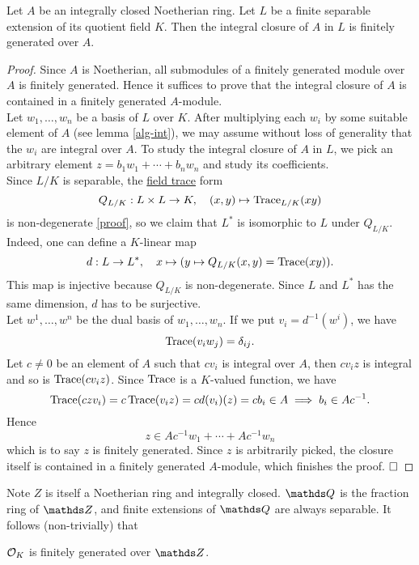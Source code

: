 			\begin{theorem}\label{closure-f-g}
				Let $A$ be an integrally closed Noetherian ring. Let $L$ be a finite separable extension of its quotient field $K$. Then the integral closure of $A$ in $L$ is finitely generated over $A$.
			\end{theorem}
			\begin{proof}
				Since $A$ is Noetherian, all submodules of a finitely generated module over $A$ is finitely generated. Hence it suffices to prove that the integral closure of $A$ is contained in a finitely generated $A$-module.\\
				Let $w_1,\dots,w_n$ be a basis of $L$ over $K$. After multiplying each $w_i$ by some suitable element of $A$ (see lemma \ref{alg-int}), we may assume without loss of generality that the $w_i$ are integral over $A$. To study the integral closure of $A$ in $L$, we pick an arbitrary element $z = b_1w_1+\cdots+b_nw_n$ and study its coefficients. \\
				Since $L/K$ is separable, the \href{https://stacks.math.columbia.edu/tag/0BIF}{field trace} form
				\[
					Q_{L/K}:L \times L \to K, \quad (x,y) \mapsto \tr_{L/K}(xy)
				\]
				is non-degenerate  \href{https://stacks.math.columbia.edu/tag/0BIL}{[proof]}, so we claim that $L^\ast$ is isomorphic to $L$ under $Q_{L/K}$. Indeed, one can define a $K$-linear map
				\[
					d:L \to L^\ast, \quad x \mapsto (y \mapsto Q_{L/K}(x,y)=\tr(xy)).
				\]
				This map is injective because $Q_{L/K}$ is non-degenerate. Since $L$ and $L^\ast$ has the same dimension, $d$ has to be surjective.\\
				Let $w^1,\dots,w^n$ be the dual basis of $w_1,\dots,w_n$. If we put $v_i=d^{-1}(w^i)$, we have
				\[
					\tr(v_i w_j) = \delta_{ij}.
				\]
				Let $c \ne 0$ be an element of $A$ such that $cv_i$ is integral over $A$, then $cv_iz$ is integral and so is $\tr(cv_iz)$. Since $\tr$ is a $K$-valued function, we have
				\[
					\tr(czv_i)=c\tr(v_iz)=c d(v_i)(z) = cb_i \in A \implies b_i \in Ac^{-1}.
				\]
				Hence
				\[
					z \in Ac^{-1}w_1+\cdots+Ac^{-1}w_n
				\]
				which is to say $z$ is finitely generated. Since $z$ is arbitrarily picked, the closure itself is contained in a finitely generated $A$-module, which finishes the proof. $\qed$
			\end{proof}
			Note $Z$ is itself a Noetherian ring and integrally closed. $\Q$ is the fraction ring of $\Z$, and finite extensions of $\Q$ are always separable. It follows (non-trivially) that
			\begin{corollary}
				$\OK$ is finitely generated over $\Z$.
			\end{corollary}
			
